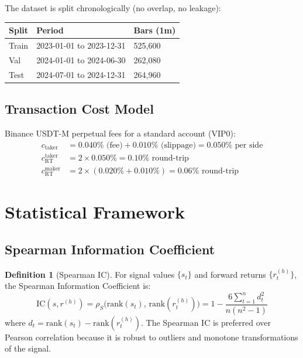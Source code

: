 \documentclass[12pt, a4paper]{article}
\theoremstyle{definition}
\newtheorem{definition}{Definition}[section]
\newcommand{\IC}{\mathrm{IC}}
\newcommand{\rank}{\mathrm{rank}}
\begin{document}
The dataset is split chronologically (no overlap, no leakage):
\begin{center}
\begin{tabular}{lll}
\toprule
Split & Period & Bars (1m) \\
\midrule
Train & 2023-01-01 to 2023-12-31 & 525,600 \\
Val   & 2024-01-01 to 2024-06-30 & 262,080 \\
Test  & 2024-07-01 to 2024-12-31 & 264,960 \\
\bottomrule
\end{tabular}
\end{center}

\subsection{Transaction Cost Model}

Binance USDT-M perpetual fees for a standard account (VIP0):
\begin{align*}
  c_{\text{taker}} &= 0.040\% \text{ (fee)} + 0.010\% \text{ (slippage)} = 0.050\%
  \text{ per side}\\
  c_{\text{RT}}^{\text{taker}} &= 2 \times 0.050\% = 0.10\% \text{ round-trip}\\
  c_{\text{RT}}^{\text{maker}} &= 2 \times (0.020\% + 0.010\%) = 0.06\%
  \text{ round-trip}
\end{align*}


\section{Statistical Framework}

\subsection{Spearman Information Coefficient}

\begin{definition}[Spearman IC]
  For signal values $\{s_t\}$ and forward returns $\{r_t^{(h)}\}$, the
  Spearman Information Coefficient is:
  \[
    \IC(s, r^{(h)}) = \rho_S\bigl(\rank(s_t),\, \rank(r_t^{(h)})\bigr)
    = 1 - \frac{6 \sum_{t=1}^{n} d_t^2}{n(n^2-1)}
  \]
  where $d_t = \rank(s_t) - \rank(r_t^{(h)})$. The Spearman IC is preferred
  over Pearson correlation because it is robust to outliers and monotone
  transformations of the signal.
\end{definition}
\end{document}
